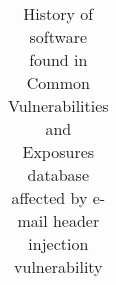 \begin{table}[tbp]
{\begin{tabular}{|c|p{5.5cm}|c|}
	\end{tabular}
	}
	\caption{History of software found in Common Vulnerabilities and
      Exposures database affected by e-mail header injection
      vulnerability}
    \vspace{-5ex}
	\label{tab:history}
\end{table}
